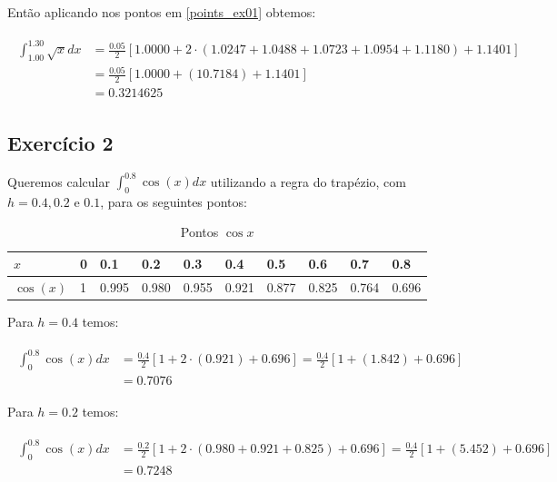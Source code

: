 \documentclass[paper=a4, fontsize=12pt]{scrartcl}
\numberwithin{equation}{section} %
\numberwithin{figure}{section} %
\numberwithin{table}{section} %
\begin{document}
		Então aplicando nos pontos em \ref{points_ex01} obtemos:

		\begin{align*}
		\begin{split}
		\int_{1.00}^{1.30} \sqrt{x} dx 	&= \frac{0.05}{2}\left[ 1.0000  + 2\cdot (1.0247 + 1.0488 + 1.0723 + 1.0954 + 1.1180) + 1.1401 \right] \\
																	&=  \frac{0.05}{2}\left[ 1.0000  + (10.7184) + 1.1401 \right] \\
																	&=  0.3214625
		\end{split}
		\end{align*}


		\subsection{Exercício 2}\label{ex02}

		Queremos calcular $\int_{0}^{0.8} \cos{(x)} dx$ utilizando a regra do trapézio, com $h = 0.4, 0.2 $ e $0.1$, para os seguintes pontos:

		\begin{table}[H]
			\def\arraystretch{1.5}
			\begin{center}
				\caption{Pontos $\cos{x}$}
				\label{points_ex02}
				\begin{tabularx}
					{\textwidth}{|X|p{1.1cm}|p{1.1cm}|p{1.1cm}|p{1.1cm}|p{1.1cm}|p{1.1cm}|p{1.1cm}|p{1.1cm}|p{1.1cm}|}
					\hline
					{$x$} & 0 & 0.1 & 0.2 & 0.3 & 0.4 & 0.5 & 0.6 & 0.7 & 0.8 \\
					\hline
					{$\cos{(x)}$} & 1 & 0.995 & 0.980 & 0.955 & 0.921  & 0.877 & 0.825 & 0.764 & 0.696 \\
					\hline
				\end{tabularx}
			\end{center}
		\end{table}

		Para $h = 0.4$ temos:

		\begin{align*}
			\begin{split}
				\int_{0}^{0.8} \cos{(x)} dx 	&= \frac{0.4}{2}\left[ 1  + 2\cdot (0.921) + 0.696 \right] =  \frac{0.4}{2}\left[ 1  + (1.842) + 0.696 \right] \\
				&=  0.7076
			\end{split}
		\end{align*}

		Para $h = 0.2$ temos:

		\begin{align*}
			\begin{split}
				\int_{0}^{0.8} \cos{(x)} dx &= \frac{0.2}{2}\left[ 1  + 2\cdot (0.980 + 0.921 + 0.825) + 0.696 \right] =  \frac{0.4}{2}\left[ 1  + (5.452) + 0.696 \right] \\
				&= 0.7248
			\end{split}
		\end{align*}
\end{document}
